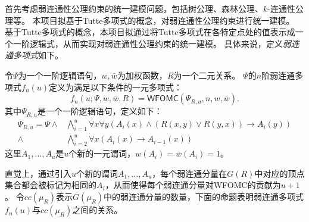 \documentclass[12pt,UTF8,AutoFakeBold=3,a4paper]{ctexart} %
\newcommand{\weight}{w}
\newcommand{\negweight}{\bar{w}}
\newcommand{\wfomc}{WFOMC}
\newcommand{\symwfomc}{\ensuremath{\mathsf{WFOMC}}}
\begin{document}
首先考虑弱连通性公理约束的统一建模问题，包括树公理、森林公理、$k$-连通性公理等。
本项目拟基于Tutte多项式的概念，对弱连通性公理约束进行统一建模。
基于Tutte多项式的概念，本项目拟通过将Tutte多项式在各特定点处的值表示成一个一阶逻辑式，从而实现对弱连通性公理约束的统一建模。
具体来说，定义\emph{弱连通多项式}如下。

\begin{definition}[弱连通多项式]\label{def:wcp}
  令$\Psi$为一个一阶逻辑语句，$\weight, \negweight$为加权函数，$R$为一个二元关系。
  $\Psi$的$n$阶弱连通多项式$f_n(u)$定义为满足以下条件的一元多项式：
  \begin{equation*}
  f_n(u;\Psi, \weight, \negweight, R) = \symwfomc(\Psi_{R,u}, n, \weight, \negweight).
  \end{equation*}
  其中$\Psi_{R,u}$是一个一阶逻辑语句，定义如下：
  \begin{equation}
    \begin{aligned}
      \Psi_{R,u} = \Psi \wedge & \bigwedge_{i=1}^u \forall x \forall y \left( A_i(x) \wedge (R(x,y) \vee R(y,x)) \to A_i(y) \right) \\
      \wedge & \bigwedge_{i = 2}^u \forall x \left( A_i(x) \to A_{i-1}(x) \right)
    \end{aligned}
    \label{eq:wcp}
  \end{equation}
  这里$A_1, \dots, A_u$是$u$个新的一元谓词，$w(A_i) = \overline{w}(A_i) = 1$。
\end{definition}

直觉上，通过引入$u$个新的谓词$A_1, \dots, A_u$，每个弱连通分量在$G(R)$中对应的顶点集合都会被标记为相同的$A_i$，从而使得每个弱连通分量对\wfomc{}的贡献为$u+1$。
令$cc(\mu_R)$表示$G(\mu_R)$中的弱连通分量的数量，下面的命题表明弱连通多项式$f_n(u)$与$cc(\mu_R)$之间的关系。
\end{document}
